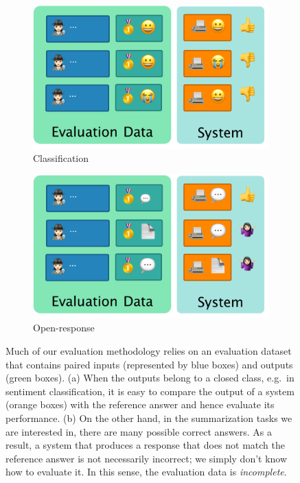 \begin{figure}
  \hfill
  \begin{subfigure}{0.45\textwidth}
  \includegraphics[width=\textwidth]{figures/classification}
  \caption{Classification}
  \end{subfigure} 
  \hfill
  \begin{subfigure}{0.45\textwidth}
  \includegraphics[width=\textwidth]{figures/generation}
  \caption{Open-response}
  \end{subfigure}
  \hfill

  \caption[Complete and incomplete evaluation sets]{\label{fig:intro:evaluation-data} 
  Much of our evaluation methodology relies on an evaluation dataset that contains paired inputs (represented by blue boxes) and outputs (green boxes).
  (a) When the outputs belong to a closed class, e.g.\ in sentiment classification, it is easy to compare the output of a system (orange boxes) with the reference answer and hence evaluate its performance.
  (b) On the other hand, in the summarization tasks we are interested in, there are many possible correct answers. As a result, a system that produces a response that does not match the reference answer is not necessarily incorrect; we simply don't know how to evaluate it. In this sense, the evaluation data is \textit{incomplete}.
  }
\end{figure}
